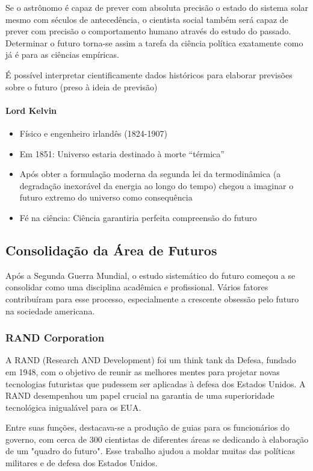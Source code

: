 Se o astrônomo é capaz de prever com absoluta precisão o estado do sistema solar mesmo com séculos de antecedência, o cientista social também será capaz de prever com precisão o comportamento humano através do estudo do passado. 
Determinar o futuro torna-se assim a tarefa da ciência política exatamente como já é para as ciências empíricas.

É possível interpretar cientificamente dados históricos para elaborar previsões sobre o futuro (preso à ideia de previsão)

\paragraph{Lord Kelvin}
\begin{itemize}
  \item Físico e engenheiro irlandês (1824-1907)
  \item Em 1851: Universo estaria destinado à morte “térmica”
  \item Após obter a formulação moderna da segunda lei da termodinâmica (a degradação inexorável da energia ao longo do tempo) chegou a imaginar o futuro extremo do universo como consequência
  \item Fé na ciência: Ciência garantiria  perfeita compreensão do futuro
\end{itemize}

\subsection{Consolidação da Área de Futuros}
Após a Segunda Guerra Mundial, o estudo sistemático do futuro começou a se consolidar como uma disciplina acadêmica e profissional. Vários fatores contribuíram para esse processo, especialmente a crescente obsessão pelo futuro na sociedade americana.

\subsubsection*{RAND Corporation}
A RAND (Research AND Development) foi um think tank da Defesa, fundado em 1948, com o objetivo de reunir as melhores mentes para projetar novas tecnologias futuristas que pudessem ser aplicadas à defesa dos Estados Unidos. A RAND desempenhou um papel crucial na garantia de uma superioridade tecnológica inigualável para os EUA.

Entre suas funções, destacava-se a produção de guias para os funcionários do governo, com cerca de 300 cientistas de diferentes áreas se dedicando à elaboração de um "quadro do futuro". Esse trabalho ajudou a moldar muitas das políticas militares e de defesa dos Estados Unidos.

